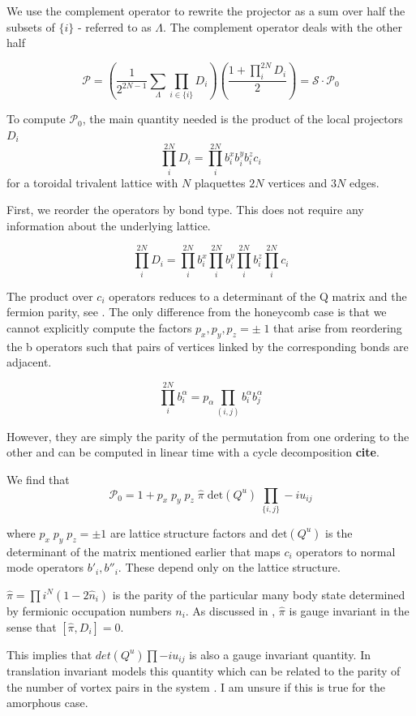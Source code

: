 We use the complement operator to rewrite the projector as a sum over half the subsets of \(\{i\}\) - referred to as \(\Lambda\). The complement operator deals with the other half

\[ \mathcal{P} =  \left( \frac{1}{2^{2N-1}} \sum_{\Lambda} \prod_{i\in\{i\}} D_i\right) \left(\frac{1 + \prod_i^{2N} D_i}{2}\right) = \mathcal{S} \cdot \mathcal{P}_0\]

To compute \(\mathcal{P}_0\), the main quantity needed is the product of the local projectors \(D_i\) \[\prod_i^{2N} D_i = \prod_i^{2N} b^x_i b^y_i b^z_i c_i \] for a toroidal trivalent lattice with \(N\) plaquettes \(2N\) vertices and \(3N\) edges.

First, we reorder the operators by bond type. This does not require any information about the underlying lattice.

\[\prod_i^{2N} D_i = \prod_i^{2N} b^x_i \prod_i^{2N} b^y_i \prod_i^{2N} b^z_i \prod_i^{2N} c_i\]

The product over \(c_i\) operators reduces to a determinant of the Q matrix and the fermion parity, see \autocite{pedrocchiPhysicalSolutionsKitaev2011b}. The only difference from the honeycomb case is that we cannot explicitly compute the factors \(p_x,p_y,p_z = \pm\;1\) that arise from reordering the b operators such that pairs of vertices linked by the corresponding bonds are adjacent.

\[\prod_i^{2N} b^\alpha_i = p_\alpha \prod_{(i,j)}b^\alpha_i b^\alpha_j\]

However, they are simply the parity of the permutation from one ordering to the other and can be computed in linear time with a cycle decomposition \textbf{cite}.

We find that \[\mathcal{P}_0 = 1 + p_x\;p_y\;p_z\; \hat{\pi} \; \mathrm{det}(Q^u) \; \prod_{\{i,j\}} -iu_{ij}\]

where \(p_x\;p_y\;p_z = \pm 1\) are lattice structure factors and \(\mathrm{det}(Q^u)\) is the determinant of the matrix mentioned earlier that maps \(c_i\) operators to normal mode operators \(b'_i, b''_i\). These depend only on the lattice structure.

\(\hat{\pi} = \prod{i}^{N} (1 - 2\hat{n}_i)\) is the parity of the particular many body state determined by fermionic occupation numbers \(n_i\). As discussed in \autocite{pedrocchiPhysicalSolutionsKitaev2011b}, \(\hat{\pi}\) is gauge invariant in the sense that \([\hat{\pi}, D_i] = 0\).

This implies that \(det(Q^u) \prod -i u_{ij}\) is also a gauge invariant quantity. In translation invariant models this quantity which can be related to the parity of the number of vortex pairs in the system \autocite{yaoAlgebraicSpinLiquid2009}. I am unsure if this is true for the amorphous case.

